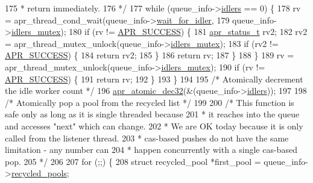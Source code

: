 \begin{DoxyCode}
175 \textcolor{comment}{         *     return immediately.}
176 \textcolor{comment}{         */}
177         \textcolor{keywordflow}{while} (queue\_info->\hyperlink{structfd__queue__info__t_a34f88b2125fb629dd4200cf75568bb1d}{idlers} == 0) \{
178             rv = apr\_thread\_cond\_wait(queue\_info->\hyperlink{structfd__queue__info__t_ab55cf55999e66ef49df240ec7ac1b750}{wait\_for\_idler},
179                                   queue\_info->\hyperlink{structfd__queue__info__t_a18d58b9d46ec7629daee1c309161b8d0}{idlers\_mutex});
180             \textcolor{keywordflow}{if} (rv != \hyperlink{group__apr__errno_ga9ee311b7bf1c691dc521d721339ee2a6}{APR\_SUCCESS}) \{
181                 \hyperlink{group__apr__errno_gaa5105fa83cc322f09382292db8b47593}{apr\_status\_t} rv2;
182                 rv2 = apr\_thread\_mutex\_unlock(queue\_info->\hyperlink{structfd__queue__info__t_a18d58b9d46ec7629daee1c309161b8d0}{idlers\_mutex});
183                 \textcolor{keywordflow}{if} (rv2 != \hyperlink{group__apr__errno_ga9ee311b7bf1c691dc521d721339ee2a6}{APR\_SUCCESS}) \{
184                     \textcolor{keywordflow}{return} rv2;
185                 \}
186                 \textcolor{keywordflow}{return} rv;
187             \}
188         \}
189         rv = apr\_thread\_mutex\_unlock(queue\_info->\hyperlink{structfd__queue__info__t_a18d58b9d46ec7629daee1c309161b8d0}{idlers\_mutex});
190         \textcolor{keywordflow}{if} (rv != \hyperlink{group__apr__errno_ga9ee311b7bf1c691dc521d721339ee2a6}{APR\_SUCCESS}) \{
191             \textcolor{keywordflow}{return} rv;
192         \}
193     \}
194 
195     \textcolor{comment}{/* Atomically decrement the idle worker count */}
196     \hyperlink{atomic_8c_a7a8d16335fdcd27f2baca90df35ad300}{apr\_atomic\_dec32}(&(queue\_info->\hyperlink{structfd__queue__info__t_a34f88b2125fb629dd4200cf75568bb1d}{idlers}));
197 
198     \textcolor{comment}{/* Atomically pop a pool from the recycled list */}
199 
200     \textcolor{comment}{/* This function is safe only as long as it is single threaded because}
201 \textcolor{comment}{     * it reaches into the queue and accesses "next" which can change.}
202 \textcolor{comment}{     * We are OK today because it is only called from the listener thread.}
203 \textcolor{comment}{     * cas-based pushes do not have the same limitation - any number can}
204 \textcolor{comment}{     * happen concurrently with a single cas-based pop.}
205 \textcolor{comment}{     */}
206 
207     \textcolor{keywordflow}{for} (;;) \{
208         \textcolor{keyword}{struct }recycled\_pool *first\_pool = queue\_info->\hyperlink{structfd__queue__info__t_ac4e7511417ba04c774bf0576cba54dc2}{recycled\_pools};

\end{DoxyCode}
